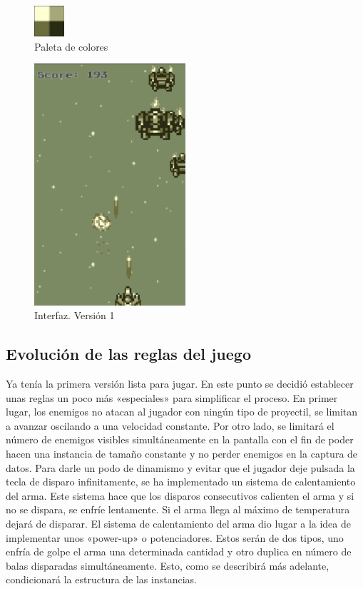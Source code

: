 \begin{figure}[]
\centering
\includegraphics[width=0.1\textwidth]{./img/paleta_de_colores}
\caption{Paleta de colores}
\end{figure}

\begin{figure}[]
\centering
\includegraphics[width=0.5\textwidth]{./img/ifaz_v1}
\caption{Interfaz. Versión 1}
\end{figure}

\subsection{Evolución de las reglas del juego}

Ya tenía la primera versión lista para jugar. En este punto se decidió establecer unas reglas un poco más «especiales» para simplificar el proceso. En primer lugar, los enemigos no atacan al jugador con ningún tipo de proyectil, se limitan a avanzar oscilando a una velocidad constante. Por otro lado, se limitará el número de enemigos visibles simultáneamente en la pantalla con el fin de poder hacen una instancia de tamaño constante y no perder enemigos en la captura de datos. Para darle un podo de dinamismo y evitar que el jugador deje pulsada la tecla de disparo infinitamente, se ha implementado un sistema de calentamiento del arma. Este sistema hace que los disparos consecutivos calienten el arma y si no se dispara, se enfríe lentamente. Si el arma llega al máximo de temperatura dejará de disparar. El sistema de calentamiento del arma dio lugar a la idea de implementar unos «power-up» o potenciadores. Estos serán de dos tipos, uno enfría de golpe el arma una determinada cantidad y otro duplica en número de balas disparadas simultáneamente. Esto, como se describirá más adelante, condicionará la estructura de las instancias.

